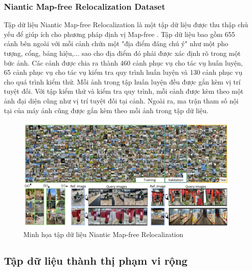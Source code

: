 \subsubsection*{Niantic Map-free Relocalization Dataset}
Tập dữ liệu Niantic Map-free Relocalization \cite{arnold2022mapfree} là một tập dữ liệu được thu thập chủ yếu để giúp ích cho phương pháp định vị Map-free \cite{arnold2022mapfree}. Tập dữ liệu bao gồm 655 cảnh bên ngoài với mỗi cảnh chứa một "địa điểm đáng chú ý" như một pho tượng, cổng, bảng hiệu,... sao cho địa điểm đó phải được xác định rõ trong một bức ảnh. Các cảnh được chia ra thành 460 cảnh phục vụ cho tác vụ huấn luyện, 65 cảnh phục vụ cho tác vụ kiểm tra quy trình huấn luyện và 130 cảnh phục vụ cho quá trình kiểm thử. Mỗi ảnh trong tập huấn luyện đều được gắn kèm vị trí tuyệt đối. Với tập kiểm thử và kiểm tra quy trình, mỗi cảnh được kèm theo một ảnh đại diện cũng như vị trí tuyệt đối tại cảnh. Ngoài ra, ma trận tham số nội tại của máy ảnh cũng được gắn kèm theo mỗi ảnh trong tập dữ liệu.
\begin{figure}[H]
    \centering
    \includegraphics[width=\textwidth]{pics/Chapter2/niantic.png}
    \caption{Minh họa tập dữ liệu Niantic Map-free Relocalization \cite{arnold2022mapfree}}
\end{figure}
\subsection{Tập dữ liệu thành thị phạm vi rộng}

